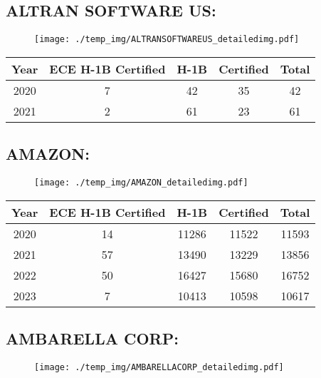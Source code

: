 \documentclass{article}%
\begin{document}
%
\newpage%
\subsection{ALTRAN SOFTWARE US:}%
\label{subsec:ALTRANSOFTWAREUS}%
\label{ALTRANSOFTWAREUSdetailed}%


\begin{figure}[htbp]%
\centering%
\texttt{[image: ./temp\_img/ALTRANSOFTWAREUS\_detailedimg.pdf]}%
\end{figure}

%
\begin{longtable}{c|c|c|c|c}%
\hline%
Year&ECE H{-}1B Certified&H{-}1B&Certified&Total\\%
\hline%
2020&7&42&35&42\\%
\hline%
2021&2&61&23&61\\%
\hline%
\end{longtable}

%
\newpage%
\subsection{AMAZON:}%
\label{subsec:AMAZON}%
\label{AMAZONdetailed}%


\begin{figure}[htbp]%
\centering%
\texttt{[image: ./temp\_img/AMAZON\_detailedimg.pdf]}%
\end{figure}

%
\begin{longtable}{c|c|c|c|c}%
\hline%
Year&ECE H{-}1B Certified&H{-}1B&Certified&Total\\%
\hline%
2020&14&11286&11522&11593\\%
\hline%
2021&57&13490&13229&13856\\%
\hline%
2022&50&16427&15680&16752\\%
\hline%
2023&7&10413&10598&10617\\%
\hline%
\end{longtable}

%
\newpage%
\subsection{AMBARELLA CORP:}%
\label{subsec:AMBARELLACORP}%
\label{AMBARELLACORPdetailed}%


\begin{figure}[htbp]%
\centering%
\texttt{[image: ./temp\_img/AMBARELLACORP\_detailedimg.pdf]}%
\end{figure}
\end{document}
